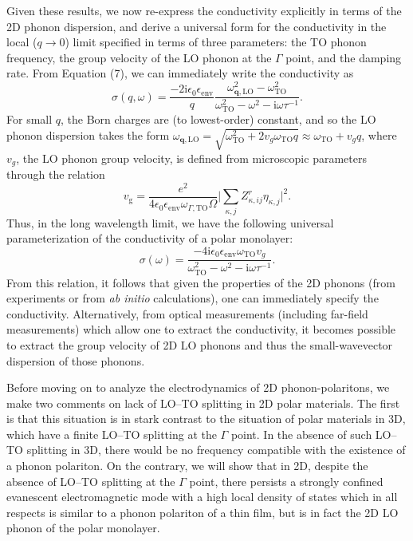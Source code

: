 \documentclass[aps,prb,twocolumn,
	           groupedaddress,superscriptaddress,
               amsfonts,amssymb,amsmath,floatfix,
	           citeautoscript]{revtex4-1}
\newcommand{\iu}{\mathrm{i}}
\begin{document}
  Given these results, we now re-express the conductivity explicitly in terms of the 2D phonon dispersion, and derive a universal form for the conductivity in the local ($q\rightarrow 0$) limit specified in terms of three parameters: the TO phonon frequency, the group velocity of the LO phonon at the $\Gamma$ point, and the damping rate. From Equation (7), we can immediately write the conductivity as
  \begin{equation}
  \sigma(q,\omega) = \frac{-2\iu\epsilon_0\epsilon_{\mathrm{env}}}{q}\frac{\omega^2_{\mathbf{q},\mathrm{LO}}-\omega^2_{\mathrm{TO}}}{\omega^2_{\mathrm{TO}}-\omega^2-\iu\omega\tau^{-1}}.
  \end{equation}
 For small $q$,  the Born charges are (to lowest-order) constant, and so the LO phonon dispersion takes the form $\omega_{\mathbf{q},\mathrm{LO}}=\sqrt{\omega^2_{\mathrm{TO}}+2v_g\omega_{\mathrm{TO}}q} \approx \omega_{\mathrm{TO}} + v_gq$, where $v_g$, the LO phonon group velocity, is defined from microscopic parameters through the relation
 \begin{equation}
    v_{\mathrm{g}} = \frac{e^2 }{4\epsilon_0 \epsilon_{\mathrm{env}}\omega_{\Gamma, \mathrm{TO}}\Omega}\Big|\sum\limits_{\kappa,j}Z^r_{\kappa,ij}\eta_{\kappa,j}  \Big|^2. 
\end{equation}
Thus, in the long wavelength limit, we have the following universal parameterization of the conductivity of a polar monolayer:
\begin{equation}
    \sigma(\omega) =  \frac{-4\iu\epsilon_0\epsilon_{\mathrm{env}}\omega_{\mathrm{TO}}v_g}{\omega^2_{\mathrm{TO}}-\omega^2-\iu\omega\tau^{-1}}.
    \label{eq:localsigma}
\end{equation}
From this relation, it follows that given the properties of the 2D phonons (from experiments or from \emph{ab initio} calculations), one can immediately specify the conductivity. Alternatively, from optical measurements (including far-field measurements) which allow one to extract the conductivity, it becomes possible to extract the group velocity of 2D LO phonons and thus the small-wavevector dispersion of those phonons. 
  
Before moving on to analyze the electrodynamics of 2D phonon-polaritons, we make two comments on lack of LO--TO splitting in 2D polar materials. The first is that this situation is in stark contrast to the situation of polar materials in 3D, which have a finite LO--TO splitting at the $\Gamma$ point. In the absence of such LO--TO splitting in 3D, there would be no frequency compatible with the existence of a phonon  polariton. On the contrary, we will show that in 2D, despite the absence of LO--TO splitting at the $\Gamma$ point, there persists a strongly confined evanescent electromagnetic mode with a high local density of states which in all respects is similar to a phonon polariton of a thin film, but is in fact the 2D LO phonon of the polar monolayer.
\end{document}
